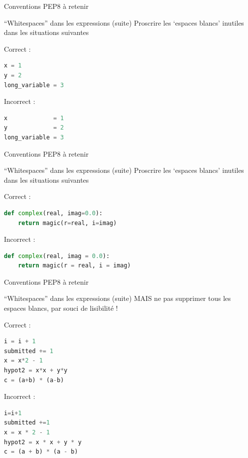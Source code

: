 \documentclass[10pt]{beamer}
\begin{document}
\begin{frame}[fragile]{Conventions PEP8 à retenir}
  \begin{block}{``Whitespaces'' dans les expressions (suite)}
    \medskip
    Proscrire les `espaces blancs' inutiles dans les situations suivantes
  \end{block}

  Correct :
\begin{lstlisting}[language=python, numbers=none]
x = 1
y = 2
long_variable = 3
\end{lstlisting}

Incorrect :
\begin{lstlisting}[language=python, numbers=none]
x             = 1
y             = 2
long_variable = 3
\end{lstlisting}
\end{frame}


\begin{frame}[fragile]{Conventions PEP8 à retenir}
  \begin{block}{``Whitespaces'' dans les expressions (suite)}
    \medskip
    Proscrire les `espaces blancs' inutiles dans les situations suivantes
  \end{block}

  Correct :
\begin{lstlisting}[language=python, numbers=none]
def complex(real, imag=0.0):
    return magic(r=real, i=imag)
\end{lstlisting}

Incorrect :
\begin{lstlisting}[language=python, numbers=none]
def complex(real, imag = 0.0):
    return magic(r = real, i = imag)
\end{lstlisting}
\end{frame}




\begin{frame}[fragile]{Conventions PEP8 à retenir}
  \begin{block}{``Whitespaces'' dans les expressions (suite)}
    \medskip
    MAIS ne pas supprimer tous les espaces blancs, par souci de lisibilité !
  \end{block}

  Correct :
\begin{lstlisting}[language=python, numbers=none]
i = i + 1
submitted += 1
x = x*2 - 1
hypot2 = x*x + y*y
c = (a+b) * (a-b)
\end{lstlisting}

Incorrect :
\begin{lstlisting}[language=python, numbers=none]
i=i+1
submitted +=1
x = x * 2 - 1
hypot2 = x * x + y * y
c = (a + b) * (a - b)
\end{lstlisting}
\end{frame}
\end{document}
